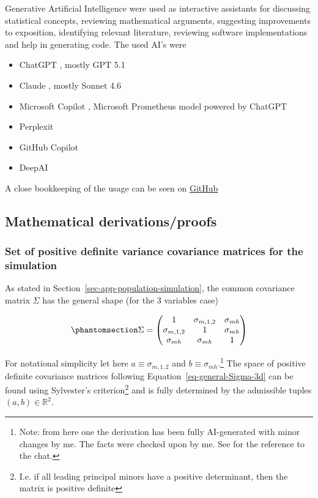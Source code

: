 \documentclass[
  12pt,
]{article}
\providecommand{\tightlist}{%
  \setlength{\itemsep}{0pt}\setlength{\parskip}{0pt}}
\begin{document}
Generative Artificial Intelligence were used as interactive assistants
for discussing statistical concepts, reviewing mathematical arguments,
suggesting improvements to exposition, identifying relevant literature,
reviewing software implementations and help in generating code. The used
AI's were

\begin{itemize}
\tightlist
\item
  ChatGPT \autocite{openai2025chatgpt}, mostly GPT 5.1
\item
  Claude \autocite{claude}, mostly Sonnet 4.6
\item
  Microsoft Copilot \autocite{microsoft_copilot}, Microsoft Prometheus
  model powered by ChatGPT
\item
  Perplexit \autocite{perplexity}
\item
  GitHub Copilot \autocite{github_copilot}
\item
  DeepAI \autocite{deepai}
\end{itemize}

A close bookkeeping of the usage can be seen on
\href{https://github.com/TheBISEconStatcian/BEReBASL/blob/main/ai_usage/ai_usage.md}{GitHub}

\subsection{Mathematical
derivations/proofs}\label{mathematical-derivationsproofs}

\subsubsection{Set of positive definite variance covariance matrices for
the simulation}\label{sec-set-pos-definite-vcovs}

As stated in Section~\ref{sec-app-population-simulation}, the common
covariance matrix \(\Sigma\) has the general shape (for the 3 variables
case)

\begin{equation}\protect\phantomsection\label{eq-general-Sigma-3d}{
\Sigma =
\begin{pmatrix}
1 & \sigma_{m,1,2} & \sigma_{mh} \\
\sigma_{m,1,2} & 1 & \sigma_{mh} \\
\sigma_{mh} & \sigma_{mh} & 1
\end{pmatrix}
}\end{equation}

For notational simplicity let here \(a \equiv \sigma_{m,1,2}\) and
\(b \equiv \sigma_{mh}\).\footnote{ Note: from here one the derivation
  has been fully AI-generated with minor changes by me. The facts were
  checked upon by me. See
  \textcite{chatgpt_positive_definite_covariance_2026} for the reference
  to the chat.} The space of positive definite covariance matrices
following Equation~\ref{eq-general-Sigma-3d} can be found using
Sylvester's criterion\footnote{ I.e. if all leading principal minors
  have a positive determinant, then the matrix is positive definite} and
is fully determined by the admissible tuples
\((a, b) \in \mathbb{R}^2\).
\end{document}
